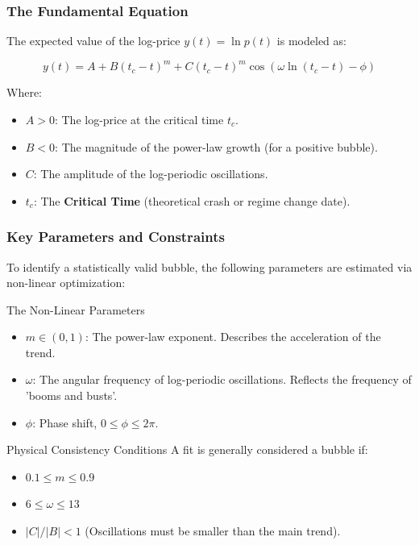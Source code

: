 \documentclass{beamer}
\begin{document}
\begin{frame}[fragile]
\frametitle{The Fundamental Equation}
    The expected value of the log-price $y(t) = \ln p(t)$ is modeled as:

    \begin{equation*}
        y(t) = A + B(t_c - t)^m + C(t_c - t)^m \cos(\omega \ln(t_c - t) - \phi)
    \end{equation*}

    \vspace{0.4cm}
    Where:
    \begin{itemize}
        \item \textbf{$A > 0$}: The log-price at the critical time $t_c$.
        \item \textbf{$B < 0$}: The magnitude of the power-law growth (for a positive bubble).
        \item \textbf{$C$}: The amplitude of the log-periodic oscillations.
        \item \textbf{$t_c$}: The \textbf{Critical Time} (theoretical crash or regime change date).
    \end{itemize}
\end{frame}

\begin{frame}
\frametitle{Key Parameters and Constraints}
    To identify a statistically valid bubble, the following parameters are estimated via non-linear optimization:

    \begin{block}{The Non-Linear Parameters}
        \begin{itemize}
            \item \textbf{$m \in (0, 1)$}: The power-law exponent. Describes the acceleration of the trend.
            \item \textbf{$\omega$}: The angular frequency of log-periodic oscillations. Reflects the frequency of 'booms and busts'.
            \item \textbf{$\phi$}: Phase shift, $0 \leq \phi \leq 2\pi$.
        \end{itemize}
    \end{block}

    \begin{block}{Physical Consistency Conditions}
        A fit is generally considered a bubble if:
        \begin{itemize}
            \item $0.1 \leq m \leq 0.9$
            \item $6 \leq \omega \leq 13$
            \item $|C|/|B| < 1$ (Oscillations must be smaller than the main trend).
        \end{itemize}
    \end{block}
\end{frame}
\end{document}
